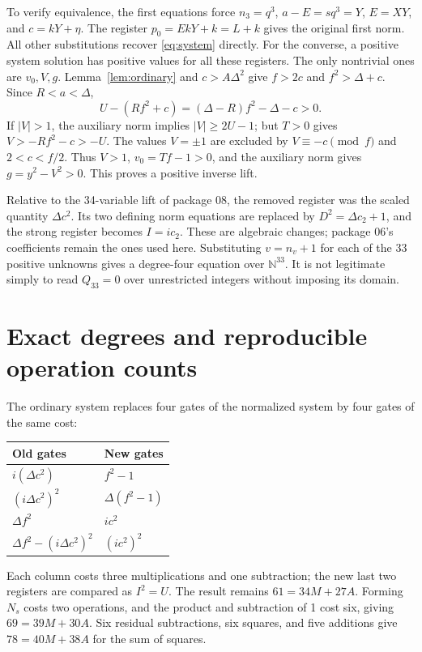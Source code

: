 \documentclass[11pt,a4paper]{article}
\theoremstyle{remark}\newtheorem{remark}[theorem]{Remark}
\newcommand{\N}{\mathbb N}
\begin{document}
To verify equivalence, the first equations force
$n_3=q^3$, $a-E=sq^3=Y$, $E=XY$, and $c=kY+\eta$.
The register $p_0=EkY+k=L+k$ gives the original first norm.
All other substitutions recover \eqref{eq:system} directly.
For the converse, a positive system solution has positive values for
all these registers. The only nontrivial ones are $v_0,V,g$.
Lemma~\ref{lem:ordinary} and $c>A\Delta^2$ give $f>2c$ and
$f^2>\Delta+c$. Since $R<a<\Delta$,
\[
 U-(Rf^2+c)=(\Delta-R)f^2-\Delta-c>0.
\]
If $|V|>1$, the auxiliary norm implies $|V|\ge2U-1$;
but $T>0$ gives $V>-Rf^2-c>-U$. The values $V=\pm1$
are excluded by $V\equiv-c\pmod f$ and $2<c<f/2$.
Thus $V>1$, $v_0=Tf-1>0$, and the auxiliary norm gives
$g=y^2-V^2>0$.
This proves a positive inverse lift.

Relative to the 34-variable lift of package 08, the removed register
was the scaled quantity $\Delta c^2$. Its two defining norm equations
are replaced by $D^2=\Delta c_2+1$, and the strong register becomes
$I=ic_2$. These are algebraic changes; package 06's coefficients
remain the ones used here. Substituting $v=n_v+1$ for each of the
33 positive unknowns gives a degree-four equation over $\N^{33}$.
It is not legitimate simply to read $Q_{33}=0$ over unrestricted
integers without imposing its domain.

\section{Exact degrees and reproducible operation counts}\label{sec:counts}
The ordinary system replaces four gates of the normalized system
by four gates of the same cost:
\begin{center}\small
\begin{tabular}{ll}
\toprule
Old gates & New gates\\
\midrule
$i(\Delta c^2)$ & $f^2-1$\\
$(i\Delta c^2)^2$ & $\Delta(f^2-1)$\\
$\Delta f^2$ & $ic^2$\\
$\Delta f^2-(i\Delta c^2)^2$ & $(ic^2)^2$\\
\bottomrule
\end{tabular}
\end{center}
Each column costs three multiplications and one subtraction; the
new last two registers are compared as $I^2=U$. The result remains
$61=34M+27A$. Forming $N_s$ costs two operations, and the product
and subtraction of 1 cost six, giving $69=39M+30A$.
Six residual subtractions, six squares, and five additions give
$78=40M+38A$ for the sum of squares.
\end{document}
